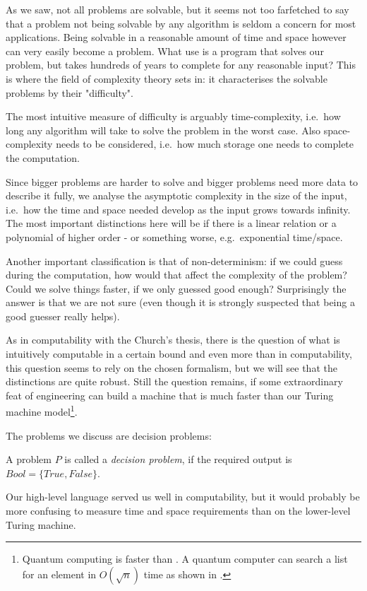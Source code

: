 As we saw, not all problems are solvable, but it seems not too farfetched to
say that a problem not being solvable by any algorithm is seldom a concern for
most applications. Being solvable in a reasonable amount of time and space
however can very easily become a problem. What use is a program that solves our
problem, but takes hundreds of years to complete for any reasonable input? This
is where the field of complexity theory sets in: it characterises the solvable
problems by their "difficulty".

The most intuitive measure of difficulty is arguably time-complexity, i.e.\ how
long any algorithm will take to solve the problem in the worst case. Also
space-complexity needs to be considered, i.e.\ how much storage one needs to
complete the computation.

Since bigger problems are harder to solve and bigger problems need more data to
describe it fully, we analyse the asymptotic complexity in the size of the
input, i.e.\ how the time and space needed develop as the input grows towards
infinity. The most important distinctions here will be if there is a linear
relation or a polynomial of higher order - or something worse, e.g.\ exponential
time/space.

Another important classification is that of non-determinism: if we could guess
during the computation, how would that affect the complexity of the problem?
Could we solve things faster, if we only guessed good enough? Surprisingly the
answer is that we are not sure (even though it is strongly suspected that being
a good guesser really helps).

As in computability with the Church's thesis, there is the question of what is
intuitively computable in a certain bound and even more than in computability,
this question seems to rely on the chosen formalism, but we will see that the
distinctions are quite robust. Still the question remains, if some
extraordinary feat of engineering can build a machine that is much faster than
our Turing machine model\footnote{Quantum computing is faster than \TM. A 
	quantum computer can search a list for an element in $O(\sqrt{n})$ time as 
	shown in \cite{grover1996fast}.}. 

The problems we discuss are decision problems:
\begin{defn}
	A problem $P$ is called a {\em decision problem}, if the required output is 
	$Bool = \{True, False\}$.
\end{defn}

Our high-level \WHILE language served us well in computability, but it would
probably be more confusing to measure time and space requirements than on the
lower-level Turing machine.

